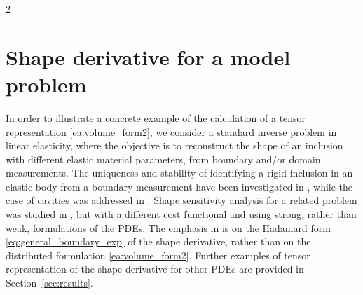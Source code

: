 \documentclass[a4paper, oneside]{article}
\newcommand{\rood}[1]{\textcolor{mydarkgreen}{#1}}
\begin{document}
\begin{multicols}{2}
\section{Shape derivative for a model problem}
\label{sec:model_prob}

In order to illustrate a concrete example of the calculation of a tensor representation \eqref{ea:volume_form2}, we consider a standard inverse problem in linear elasticity, where the objective is to reconstruct the shape of an inclusion with different elastic material parameters, from boundary and/or domain measurements.
The uniqueness and stability of identifying a rigid inclusion in an elastic body from a boundary measurement have been investigated in \cite{Morassi2009}, while the case of cavities was addressed in \cite{MR1772729}.
Shape sensitivity analysis for a related problem was studied in \cite{MEFTAHI20151554}, but with a different cost functional and using strong, rather than weak, formulations of the PDEs. The emphasis in \cite{MEFTAHI20151554} is on the Hadamard form \eqref{eq:general_boundary_exp} of the shape derivative, rather than on the distributed formulation \eqref{ea:volume_form2}.
Further examples of tensor representation of the shape derivative for other PDEs are provided in Section~\ref{sec:results}.


\end{multicols}
\end{document}
